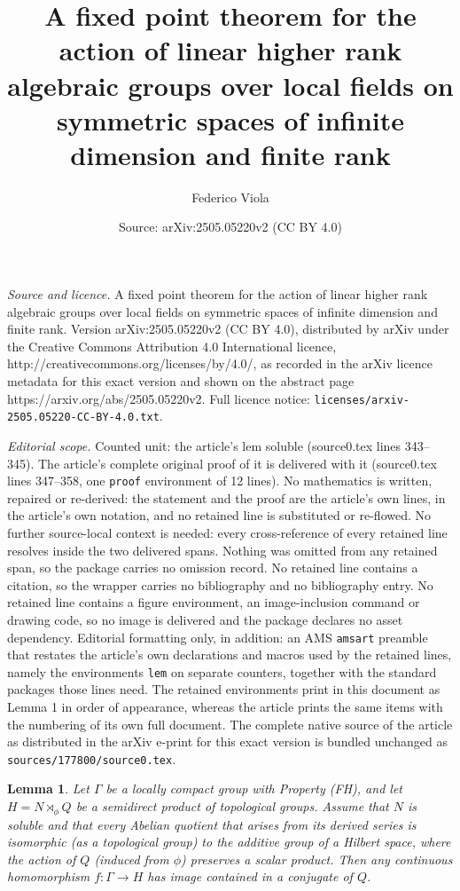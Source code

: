 \documentclass[10pt,a4paper]{amsart}
\title{A fixed point theorem for the action of linear higher rank algebraic groups over local fields on symmetric spaces of infinite dimension and finite rank}
\author{Federico Viola}
\date{Source: arXiv:2505.05220v2 (CC BY 4.0)}
\newtheorem{lem}{Lemma}
\begin{document}
\maketitle

\noindent\emph{Source and licence.} A fixed point theorem for the action of linear higher rank algebraic groups over local fields on symmetric spaces of infinite dimension and finite rank. Version arXiv:2505.05220v2 (CC BY 4.0), distributed by arXiv under the Creative Commons Attribution 4.0 International licence, http://creativecommons.org/licenses/by/4.0/, as recorded in the arXiv licence metadata for this exact version and shown on the abstract page https://arxiv.org/abs/2505.05220v2. Full licence notice: \texttt{licenses/arxiv-2505.05220-CC-BY-4.0.txt}.\par\smallskip

\noindent\textit{Editorial scope.} Counted unit: the article's lem soluble (source0.tex lines 343--345). The article's complete original proof of it is delivered with it (source0.tex lines 347--358, one \texttt{proof} environment of 12 lines). No mathematics is written, repaired or re-derived: the statement and the proof are the article's own lines, in the article's own notation, and no retained line is substituted or re-flowed.  No further source-local context is needed: every cross-reference of every retained line resolves inside the two delivered spans.  Nothing was omitted from any retained span, so the package carries no omission record.  No retained line contains a citation, so the wrapper carries no bibliography and no bibliography entry.  No retained line contains a figure environment, an image-inclusion command or drawing code, so no image is delivered and the package declares no asset dependency.  Editorial formatting only, in addition: an AMS \texttt{amsart} preamble that restates the article's own declarations and macros used by the retained lines, namely the environments \texttt{lem} on separate counters, together with the standard packages those lines need.  The retained environments print in this document as Lemma 1 in order of appearance, whereas the article prints the same items with the numbering of its own full document.  The complete native source of the article as distributed in the arXiv e-print for this exact version is bundled unchanged as \texttt{sources/177800/source0.tex}.
\begin{lem} \label{soluble}
    Let $\Gamma$ be a locally compact group with Property (FH), and let $H=N\rtimes_\phi Q$ be a semidirect product of topological groups. Assume that $N$ is soluble and that every Abelian quotient that arises from its derived series is isomorphic (as a topological group) to the additive group of a Hilbert space, where the action of $Q$ (induced from $\phi$) preserves a scalar product. Then any continuous homomorphism $f:\Gamma\rightarrow H$ has image contained in a conjugate of $Q$.
\end{lem}
\end{document}
